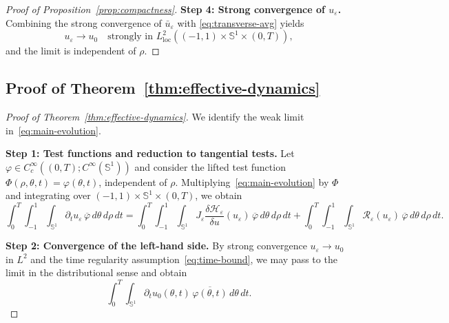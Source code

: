 \documentclass[11pt]{amsart}
\theoremstyle{plain}
\theoremstyle{definition}
\theoremstyle{remark}
\theoremstyle{remark}
\begin{document}
\begin{proof}[Proof of Proposition~\ref{prop:compactness}]
\smallskip
\noindent\textbf{Step 4: Strong convergence of \(u_\varepsilon\).}
Combining the strong convergence of \(\bar u_\varepsilon\) with
\eqref{eq:transverse-avg} yields
\[
u_\varepsilon \to u_0
\quad\text{strongly in }L^2_{\mathrm{loc}}((-1,1)\times\mathbb S^1\times(0,T)),
\]
and the limit is independent of \(\rho\).
\end{proof}

\subsection{Proof of Theorem~\ref{thm:effective-dynamics}}
\label{subsec:proof-effective}

\begin{proof}[Proof of Theorem~\ref{thm:effective-dynamics}]
We identify the weak limit in~\eqref{eq:main-evolution}.

\smallskip
\noindent\textbf{Step 1: Test functions and reduction to tangential tests.}
Let \(\varphi\in C_c^\infty((0,T);C^\infty(\mathbb S^1))\) and consider the lifted
test function \(\Phi(\rho,\theta,t)=\varphi(\theta,t)\), independent of \(\rho\).
Multiplying~\eqref{eq:main-evolution} by \(\Phi\) and integrating over
\((-1,1)\times\mathbb S^1\times(0,T)\), we obtain
\begin{equation}
\label{eq:weak-form}
\int_0^T\!\!\int_{-1}^1\!\!\int_{\mathbb S^1}
\partial_t u_\varepsilon\,\overline{\varphi}\,d\theta\,d\rho\,dt
=
\int_0^T\!\!\int_{-1}^1\!\!\int_{\mathbb S^1}
J_\varepsilon\frac{\delta\mathcal H_\varepsilon}{\delta u}(u_\varepsilon)\,
\overline{\varphi}\,d\theta\,d\rho\,dt
+
\int_0^T\!\!\int_{-1}^1\!\!\int_{\mathbb S^1}
\mathcal R_\varepsilon(u_\varepsilon)\,\overline{\varphi}\,d\theta\,d\rho\,dt.
\end{equation}

\smallskip
\noindent\textbf{Step 2: Convergence of the left-hand side.}
By strong convergence \(u_\varepsilon\to u_0\) in \(L^2\) and the time regularity
assumption~\eqref{eq:time-bound}, we may pass to the limit in the distributional
sense and obtain
\[
\int_0^T\!\!\int_{\mathbb S^1} \partial_t u_0(\theta,t)\,\overline{\varphi(\theta,t)}\,d\theta\,dt.
\]


\end{proof}
\end{document}
